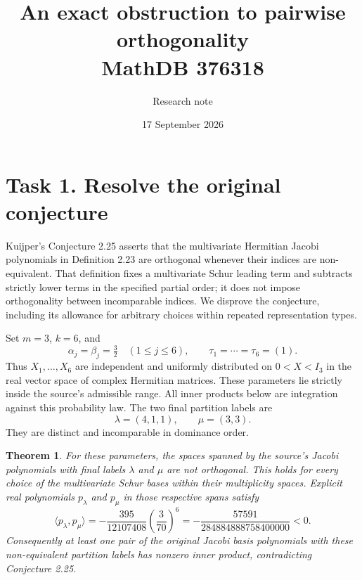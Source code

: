 \documentclass[11pt]{article}
\title{An exact obstruction to pairwise orthogonality\\MathDB 376318}
\author{Research note}
\date{17 September 2026}
\newtheorem{theorem}{Theorem}
\newcommand{\ip}[2]{\langle #1,#2\rangle}
\begin{document}
\maketitle

\section*{Task 1. Resolve the original conjecture}
Kuijper's Conjecture 2.25 \cite[p.~26]{K} asserts that the multivariate
Hermitian Jacobi polynomials in Definition 2.23 are orthogonal whenever
their indices are non-equivalent. That definition fixes a multivariate
Schur leading term and subtracts strictly lower terms in the specified
partial order; it does not impose orthogonality between incomparable
indices. We disprove the conjecture, including its allowance for
arbitrary choices within repeated representation types.

Set $m=3$, $k=6$, and
\[
 \alpha_j=\beta_j=\tfrac32\quad(1\le j\le6),\qquad
 \tau_1=\cdots=\tau_6=(1).
\]
Thus $X_1,\ldots,X_6$ are independent and uniformly distributed on
$0<X<I_3$ in the real vector space of complex Hermitian matrices.
These parameters lie strictly inside the source's admissible range.
All inner products below are integration against this probability law.
The two final partition labels are
\[
 \lambda=(4,1,1),\qquad \mu=(3,3).
\]
They are distinct and incomparable in dominance order.

\begin{theorem}
For these parameters, the spaces spanned by the source's Jacobi
polynomials with final labels $\lambda$ and $\mu$ are not orthogonal.
This holds for every choice of the multivariate Schur bases within
their multiplicity spaces. Explicit real polynomials $p_\lambda$ and
$p_\mu$ in those respective spans satisfy
\[
 \boxed{\ip{p_\lambda}{p_\mu}
 =-\frac{395}{12107408}\left(\frac3{70}\right)^6
 =-\frac{57591}{284884888758400000}<0.}
\]
Consequently at least one pair of the original Jacobi basis
polynomials with these non-equivalent partition labels has nonzero
inner product, contradicting Conjecture 2.25.
\end{theorem}
\end{document}
